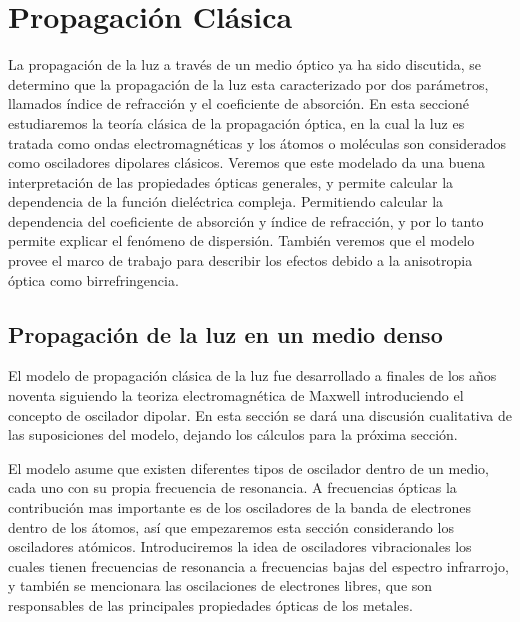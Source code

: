 \documentclass[a4paper,openright,12pt]{book}
\begin{document}
\section{Propagación Clásica}
La propagación de la luz a través de un medio óptico ya ha sido discutida, se determino que la propagación de la luz esta caracterizado por dos parámetros, llamados índice de refracción y el coeficiente de absorción. En esta seccioné estudiaremos la teoría clásica de la propagación óptica, en la cual la luz es tratada como ondas electromagnéticas y los átomos o moléculas son considerados como osciladores dipolares clásicos. Veremos que este modelado da una buena interpretación de las propiedades ópticas generales, y permite calcular la dependencia de la función dieléctrica compleja. Permitiendo calcular la dependencia del coeficiente de absorción y índice de refracción, y por lo tanto permite explicar el fenómeno de dispersión. También veremos que el modelo provee el marco de trabajo para describir los efectos debido a la anisotropia óptica como birrefringencia.

\subsection{Propagación de la luz en un medio denso}
El modelo de propagación clásica de la luz fue desarrollado a finales de los años noventa siguiendo la teoriza electromagnética de Maxwell introduciendo el concepto de oscilador dipolar. En esta sección se dará una discusión cualitativa de las suposiciones del modelo, dejando los cálculos para la próxima sección.

El modelo asume que existen diferentes tipos de oscilador dentro de un medio, cada uno con su propia frecuencia de resonancia. A frecuencias ópticas la contribución mas importante es de los osciladores de la banda de electrones dentro de los átomos, así que empezaremos esta sección considerando los osciladores atómicos. Introduciremos la idea de osciladores vibracionales los cuales tienen frecuencias de resonancia a frecuencias bajas del espectro infrarrojo, y también se mencionara las oscilaciones de electrones libres, que son responsables de las principales propiedades ópticas de los metales.
\end{document}
